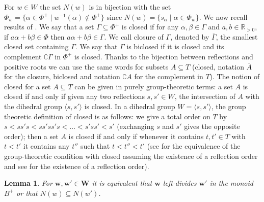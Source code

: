\documentclass{amsart}
\numberwithin{equation}{section}
\newtheorem{lemma}[equation]{Lemma}
\newcommand\inv{^{-1}}
\newcommand\bv{{\mathbf v}}
\newcommand\bw{{\mathbf w}}
\newcommand\bW{{\mathbf W}}
\newcommand\BR{{\mathbb R}}
\DeclareMathOperator\rightlcm{right-lcm}
\begin{document}
For $w\in W$ the set $N(w)$ is in bijection
with the set $\Phi_w=\{\alpha\in\Phi^+\mid
w\inv(\alpha)\notin\Phi^+\}$ since $N(w)=\{s_\alpha\mid\alpha\in\Phi_w\}$. 
We now recall results of \cite{dyer}.
We say that a set $\Gamma\subseteq\Phi^+$ is closed if for any
$\alpha,\beta\in\Gamma$ and $a,b\in\BR_{>0}$, if $a\alpha+b\beta\in\Phi$
then $a\alpha+b\beta\in\Gamma$. We call closure of $\Gamma$, denoted by
 $\overline\Gamma$, the smallest closed set containing $\Gamma$. We
say that $\Gamma$ is biclosed if it is closed and its complement $\complement\Gamma$ in
$\Phi^+$ is closed. Thanks to the bijection between reflections and positive roots we
can use the same words for subsets $A\subseteq T$
(closed, notation $\bar A$ for the closure, 
biclosed and notation  $\complement A$ for the complement in $ T$).
The notion of closed for a set $A\subseteq T$ can be given in purely
group-theoretic terms: a set $A$
is closed if and only if given any two reflections $s,s'\in W$, the intersection of $A$
with the dihedral group $\langle s,s'\rangle$ is closed.  In a dihedral group
$W=\langle s,s'\rangle$, the group theoretic definition of closed is as follows: 
we give a total order on $ T$ by $s < ss's <ss'ss's<\ldots< s'ss'<s'$
(exchanging $s$ and $s'$ gives the opposite
order); then a set $A$ is closed if and only if whenever it contains $t,t'\in T$ with
$t<t'$ it contains any $t''$ such that $t<t''<t'$ (see
\cite[(2.2)]{dyer1} for the equivalence of the group-theoretic condition with
closed assuming the existence of a reflection order and see
\cite[Proposition 2.3]{dyer1} for the existence of a reflection order).
\begin{lemma} \label{inclusionN} For $\bw,\bw'\in\bW$ it is equivalent that
$\bw$ left-divides $\bw'$ in the monoid $B^+$ or that $N(w)\subseteq N(w')$.
\end{lemma}
\end{document}
